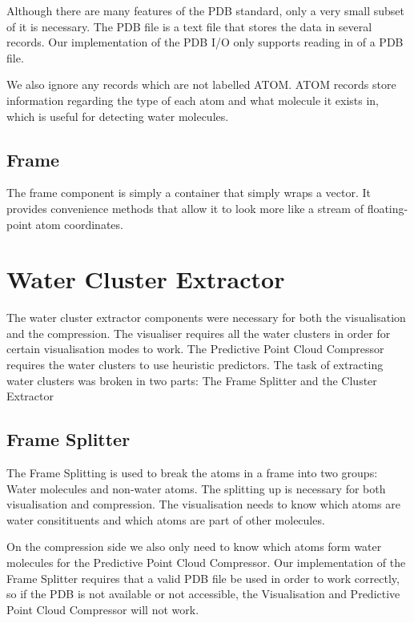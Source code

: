 \documentclass[a4paper,11pt]{report}
\begin{document}
Although there are many features of the PDB standard, only a very small subset of it is necessary. The PDB file is a text file that stores the data in several records. Our implementation of the PDB I/O only supports reading in of a PDB file. 

We also ignore any records which are not labelled ATOM. ATOM records store information regarding the type of each atom and what molecule it exists in, which is useful for detecting water molecules.

\subsection{Frame}

The frame component is simply a container that simply wraps a vector. It provides convenience methods that allow it to look more like a stream of floating-point atom coordinates.

\section{Water Cluster Extractor}

The water cluster extractor components were necessary for both the visualisation and the compression. The visualiser requires all the water clusters in order for certain visualisation modes to work. The Predictive Point Cloud Compressor requires the water clusters to use heuristic predictors. The task of extracting water clusters was broken in two parts: The Frame Splitter and the Cluster Extractor

\subsection{Frame Splitter}

The Frame Splitting is used to break the atoms in a frame into two groups: Water molecules and non-water atoms. The splitting up is necessary for both visualisation and compression. The visualisation needs to know which atoms are water consitituents and which atoms are part of other molecules. 

On the compression side we also only need to  know which atoms form water molecules for the Predictive Point Cloud Compressor. Our implementation of the Frame Splitter requires that a valid PDB file be used in order to work correctly, so if the PDB is not available or not accessible, the Visualisation and Predictive Point Cloud Compressor will not work. 
\end{document}
